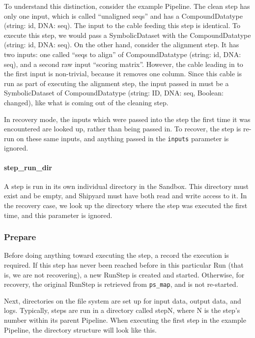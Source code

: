 \documentclass[12pt]{article}
\newcommand{\code}[1]{\texttt{#1}}
\begin{document}
To understand this distinction, consider the example Pipeline. The clean step
has only one input, which is called ``unaligned seqs'' and has a
CompoundDatatype (string: id, DNA: seq). The input to the cable feeding this
step is identical.  To execute this step, we would pass a SymbolicDataset with
the CompoundDatatype (string: id, DNA: seq). On the other hand, consider the
alignment step. It has two inputs: one called ``seqs to align'' of
CompoundDatatype (string: id, DNA: seq), and a second raw input ``scoring
matrix''. However, the cable leading in to the first input is non-trivial,
because it removes one column. Since this cable is run as part of executing the
alignment step, the input passed in must be a SymbolicDataset of
CompoundDatatype (string: ID, DNA: seq, Boolean: changed), like what is coming
out of the cleaning step.

In recovery mode, the inputs which were passed into the step the first time it
was encountered are looked up, rather than being passed in. To recover, the
step is re-run on these same inputs, and anything passed in the \code{inputs}
parameter is ignored.

\paragraph*{step\_run\_dir}

A step is run in its own individual directory in the Sandbox. This directory
must exist and be empty, and Shipyard must have both read and write access to
it. In the recovery case, we look up the directory where the step was executed
the first time, and this parameter is ignored.

\subsubsection*{Prepare}

Before doing anything toward executing the step, a record the execution is
required. If this step has never been reached before in this particular Run
(that is, we are not recovering), a new RunStep is created and started.
Otherwise, for recovery, the original RunStep is retrieved from \code{ps\_map},
and is not re-started. 

Next, directories on the file system are set up for input data, output data,
and logs. Typically, steps are run in a directory called stepN, where N is the
step's number within its parent Pipeline. When executing the first step in the
example Pipeline, the directory structure will look like this.
\end{document}
